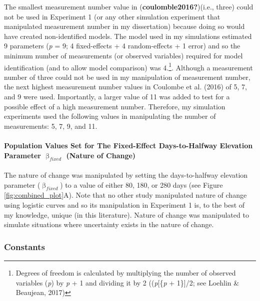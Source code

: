\documentclass[
12pt, %
twoside,
english]{guelphthesis}
\theoremstyle{definition}
\theoremstyle{definition}
\theoremstyle{definition}
\theoremstyle{definition}
\theoremstyle{remark}
\begin{document}
The smallest measurement number value in (\textbf{coulomble2016?})(i.e., three) could not be used in Experiment 1 (or any other simulation experiment that manipulated measurement number in my dissertation) because doing so would have created non-identified models. The model used in my simulations estimated 9 parameters (\emph{p} = 9; 4 fixed-effects + 4 random-effects + 1
error) and so the minimum number of measurements (or observed variables) required for model identification (and to allow model comparison) was 4.\footnote{Degrees of freedom is calculated by multiplying the number of observed variables (\textit{p})
by \textit{p} + 1 and dividing it by 2 ((\textit{p}{[}\{\textit{p} + 1\}{]}/2; see Loehlin \& Beaujean, 2017)}. Although a measurement number of three could not be used in my manipulation of measurement number, the next highest measurement number values in Coulombe et al. (2016) of 5, 7, and 9 were used. Importantly, a larger value of 11 was added to test for a possible effect of a high measurement number. Therefore, my simulation experiments used the following values in manipulating the number of
measurements: 5, 7, 9, and 11.

\hypertarget{population-values-set-for-the-fixed-effect-days-to-halfway-elevation-parameter-upbeta_fixed-nature-of-change}{%
\paragraph{\texorpdfstring{Population Values Set for The Fixed-Effect Days-to-Halfway Elevation Parameter \(\upbeta_{fixed}\) (Nature of Change)}{Population Values Set for The Fixed-Effect Days-to-Halfway Elevation Parameter \textbackslash upbeta\_\{fixed\} (Nature of Change)}}\label{population-values-set-for-the-fixed-effect-days-to-halfway-elevation-parameter-upbeta_fixed-nature-of-change}}

The nature of change was manipulated by setting the days-to-halfway elevation parameter (\(\upbeta_{fixed}\)) to a value of either 80, 180, or 280 days (see Figure \ref{fig:combined_plot}A). Note that no other study manipulated nature of change using logistic curves and so its manipulation in Experiment 1 is, to the best of my knowledge, unique (in this literature). Nature of change was manipulated to simulate situations where uncertainty exists in the nature of change.

\hypertarget{constants}{%
\subsubsection{Constants}\label{constants}}
\end{document}
